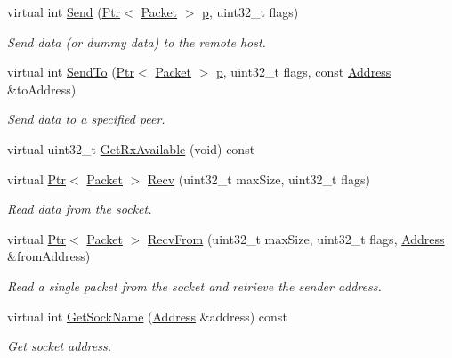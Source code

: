 \begin{DoxyCompactItemize}
virtual int \hyperlink{classns3_1_1PacketSocket_a1fd81b9271758334d6abad658580b1a0}{Send} (\hyperlink{classns3_1_1Ptr}{Ptr}$<$ \hyperlink{classns3_1_1Packet}{Packet} $>$ \hyperlink{lte__link__budget__x2__handover__measures_8m_ac9de518908a968428863f829398a4e62}{p}, uint32\+\_\+t flags)
\begin{DoxyCompactList}\small\item\em Send data (or dummy data) to the remote host. \end{DoxyCompactList}\item 
virtual int \hyperlink{classns3_1_1PacketSocket_a66dc5b7e29ad76f07ff46368f75b9165}{Send\+To} (\hyperlink{classns3_1_1Ptr}{Ptr}$<$ \hyperlink{classns3_1_1Packet}{Packet} $>$ \hyperlink{lte__link__budget__x2__handover__measures_8m_ac9de518908a968428863f829398a4e62}{p}, uint32\+\_\+t flags, const \hyperlink{classns3_1_1Address}{Address} \&to\+Address)
\begin{DoxyCompactList}\small\item\em Send data to a specified peer. \end{DoxyCompactList}\item 
virtual uint32\+\_\+t \hyperlink{classns3_1_1PacketSocket_a088f17e0f260b028521b9ef230016a86}{Get\+Rx\+Available} (void) const 
\item 
virtual \hyperlink{classns3_1_1Ptr}{Ptr}$<$ \hyperlink{classns3_1_1Packet}{Packet} $>$ \hyperlink{classns3_1_1PacketSocket_a8f19cc86b32a0a80a2738be64e05b202}{Recv} (uint32\+\_\+t max\+Size, uint32\+\_\+t flags)
\begin{DoxyCompactList}\small\item\em Read data from the socket. \end{DoxyCompactList}\item 
virtual \hyperlink{classns3_1_1Ptr}{Ptr}$<$ \hyperlink{classns3_1_1Packet}{Packet} $>$ \hyperlink{classns3_1_1PacketSocket_a03c078024aa5ab71c8d0b6d951a740dc}{Recv\+From} (uint32\+\_\+t max\+Size, uint32\+\_\+t flags, \hyperlink{classns3_1_1Address}{Address} \&from\+Address)
\begin{DoxyCompactList}\small\item\em Read a single packet from the socket and retrieve the sender address. \end{DoxyCompactList}\item 
virtual int \hyperlink{classns3_1_1PacketSocket_a78d52c70c989f0473e64cb51301b2379}{Get\+Sock\+Name} (\hyperlink{classns3_1_1Address}{Address} \&address) const 
\begin{DoxyCompactList}\small\item\em Get socket address. \end{DoxyCompactList}\item 

\end{DoxyCompactItemize}
